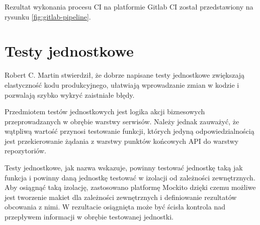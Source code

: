 \par
Rezultat wykonania procesu CI na platformie Gitlab CI został przedstawiony na rysunku \ref{fig:gitlab-pipeline}.


\section{Testy jednostkowe}

Robert C. Martin stwierdził, że dobrze napisane testy jednostkowe zwiększają elastyczność kodu produkcyjnego,
ułatwiają wprowadzanie zmian w kodzie i pozwalają szybko wykryć zaistniałe błędy\cite{book:czysty-kod}.

\par
Przedmiotem testów jednostkowych jest logika akcji biznesowych przeprowadzanych w obrębie warstwy serwisów.
Należy jednak zauważyć, że wątpliwą wartość przynosi testowanie funkcji,
których jedyną odpowiedzialnością jest przekierowanie żądania z warstwy punktów końcowych API do warstwy repozytoriów.

\par
Testy jednostkowe, jak nazwa wskazuje, powinny testować jednostkę taką jak funkcja i powinny daną jednostkę testować w izolacji od zależności zewnętrznych\cite{book:testy-jednostkowe}.
Aby osiągnąć taką izolację, zastosowano platformę Mockito dzięki czemu możliwe jest tworzenie makiet dla zależności zewnętrznych i definiowanie rezultatów obcowania z nimi.
W rezultacie osiągnięta może być ścisła kontrola nad przepływem informacji w obrębie testowanej jednostki.

